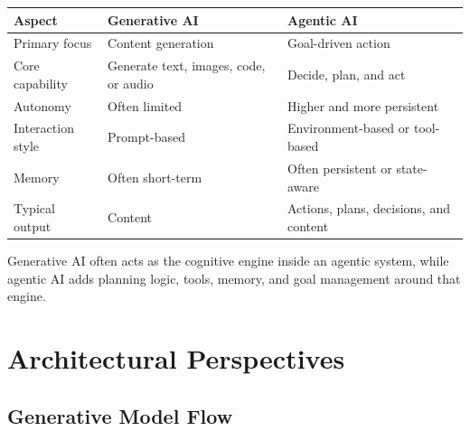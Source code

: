 \documentclass[11pt,a4paper]{article}
\begin{document}
\begin{center}
\begin{tabular}{@{}p{2.8cm}p{4.2cm}p{4.2cm}@{}}
\toprule
\textbf{Aspect} & \textbf{Generative AI} & \textbf{Agentic AI} \\
\midrule
Primary focus & Content generation & Goal-driven action \\
Core capability & Generate text, images, code, or audio & Decide, plan, and act \\
Autonomy & Often limited & Higher and more persistent \\
Interaction style & Prompt-based & Environment-based or tool-based \\
Memory & Often short-term & Often persistent or state-aware \\
Typical output & Content & Actions, plans, decisions, and content \\
\bottomrule
\end{tabular}
\end{center}

\begin{conceptbox}
Generative AI often acts as the cognitive engine inside an agentic system, while agentic AI adds planning logic, tools, memory, and goal management around that engine.
\end{conceptbox}

\section{Architectural Perspectives}

\subsection{Generative Model Flow}

\begin{center}
\end{center}
\end{document}
